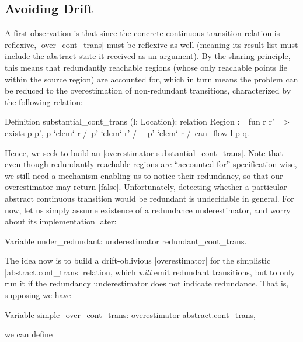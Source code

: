 \documentclass[runningheads]{llncs}
\begin{document}
\subsection{Avoiding Drift}

A first observation is that since the concrete continuous transition relation is reflexive, |over_cont_trans| must be reflexive as well (meaning its result list must include the abstract state it received as an argument). By the sharing principle, this means that redundantly reachable regions (whose only reachable points lie within the source region) are accounted for, which in turn means the problem can be reduced to the overestimation of non-redundant transitions, characterized by the following relation:
\begin{code}
Definition substantial_cont_trans (l: Location): relation Region
  := fun r r' => exists p p', p `elem` r /\ p' `elem` r' /\ ~ p' `elem` r /\ can_flow l p q.
\end{code}
Hence, we seek to build an |overestimator substantial_cont_trans|. Note that even though redundantly reachable regions are ``accounted for'' specification-wise, we still need a mechanism enabling us to notice their redundancy, so that our overestimator may return |false|. Unfortunately, detecting whether a particular abstract continuous transition would be redundant is undecidable in general. For now, let us simply assume existence of a redundance underestimator, and worry about its implementation later:

% 
% 
% 

\begin{code}
Variable under_redundant: underestimator redundant_cont_trans.
\end{code}
The idea now is to build a drift-oblivious |overestimator| for the simplistic |abstract.cont_trans| relation, which \emph{will} emit redundant transitions, but to only run it if the redundancy underestimator does not indicate redundance. That is, supposing we have
\begin{code}
Variable simple_over_cont_trans: overestimator abstract.cont_trans,
\end{code}
we can define
\end{document}
